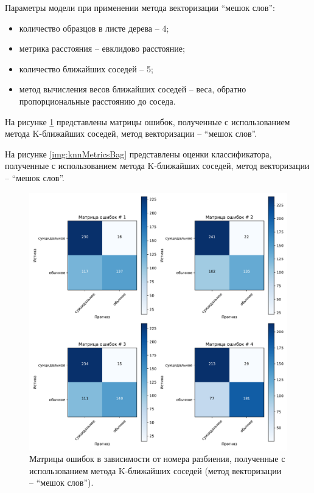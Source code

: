 Параметры модели при применении метода векторизации ``мешок слов'':
\begin{itemize}
	\item количество образцов в листе дерева -- 4;
	\item метрика расстояния -- евклидово расстояние;
	\item количество ближайших соседей -- 5;
	\item метод вычисления весов ближайших соседей -- веса, обратно пропорциональные расстоянию до соседа.
\end{itemize}

На рисунке \ref{img:knnMatrBag} представлены матрицы ошибок, полученные с использованием метода K-ближайших соседей, метод векторизации -- ``мешок слов''.

На рисунке \ref{img:knnMetricsBag} представлены оценки классификатора, полученные с использованием метода K-ближайших соседей, метод векторизации -- ``мешок слов''.

\begin{figure}[H]
	\centering
	\includegraphics[width=\textwidth]{inc/plots/knnMatrBag.pdf}
	\caption{ Матрицы ошибок в зависимости от номера разбиения, полученные с использованием метода K-ближайших соседей (метод векторизации -- ``мешок слов''). }
	\label{img:knnMatrBag}
\end{figure}

